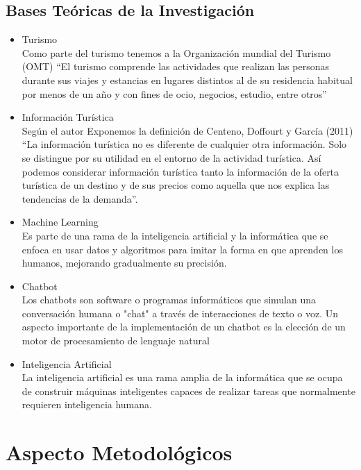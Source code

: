 \documentclass[12pt,a4paper,oneside]{article}
\begin{document}
\subsection{Bases Teóricas de la Investigación}
\begin{itemize}
  \item Turismo\\
  Como parte del turismo tenemos a la Organización mundial del Turismo (OMT) “El turismo comprende las actividades que realizan las personas durante sus viajes y estancias en lugares distintos al de su residencia habitual por menos de un año y con fines de ocio, negocios, estudio, entre otros”
\item Información Turística \\
  Según el autor Exponemos la definición de Centeno, Doffourt y García (2011) “La información turística no es diferente de cualquier otra información. Solo se distingue por su utilidad en el entorno de la actividad turística. Así podemos considerar información turística tanto la información de la oferta turística de un destino y de sus precios como aquella que nos explica las tendencias de la demanda”.
  \item Machine Learning \\
  Es  parte de una rama de la inteligencia artificial y la informática que se enfoca en usar datos y algoritmos para imitar la forma en que aprenden los humanos, mejorando gradualmente su precisión.
  \item Chatbot \\
  Los chatbots son software o programas informáticos que simulan una conversación humana o "chat" a través de interacciones de texto o voz. Un aspecto importante de la implementación de un chatbot es la elección de un motor de procesamiento de lenguaje natural
  \item Inteligencia Artificial\\
  La inteligencia artificial es una rama amplia de la informática que se ocupa de construir máquinas inteligentes capaces de realizar tareas que normalmente requieren inteligencia humana.
  
\end{itemize}
\section{Aspecto Metodológicos}
\end{document}

